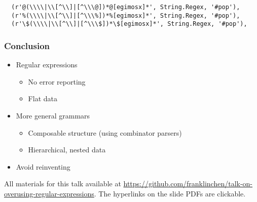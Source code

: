 \begin{frame}[fragile]
\begin{verbatim}
  (r'@(\\\\|\\[^\\]|[^\\\@])*@[egimosx]*', String.Regex, '#pop'),
  (r'%(\\\\|\\[^\\]|[^\\\%])*%[egimosx]*', String.Regex, '#pop'),
  (r'\$(\\\\|\\[^\\]|[^\\\$])*\$[egimosx]*', String.Regex, '#pop'),
  \end{verbatim}
\end{frame}

\begin{frame}
  \frametitle{Conclusion}

  \begin{itemize}
    \item Regular expressions
      \begin{itemize}
        \item No error reporting
        \item Flat data
      \end{itemize}
    \item More general grammars
      \begin{itemize}
        \item Composable structure (using combinator parsers)
        \item Hierarchical, nested data
      \end{itemize}
    \item Avoid reinventing
  \end{itemize}

  All materials for this talk available at \url{https://github.com/franklinchen/talk-on-overusing-regular-expressions}. The hyperlinks on the slide PDFs are clickable.
\end{frame}



